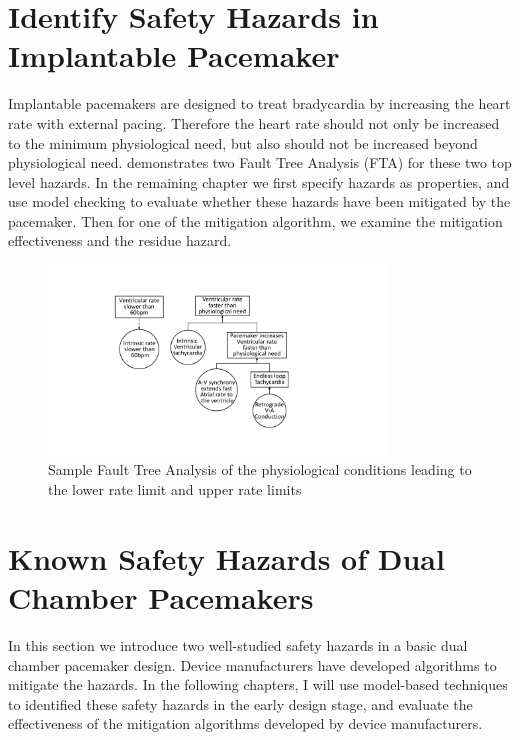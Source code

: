 \section{Identify Safety Hazards in Implantable Pacemaker}
Implantable pacemakers are designed to treat bradycardia by increasing the heart rate with external pacing. Therefore the heart rate should not only be increased to the minimum physiological need, but also should not be increased beyond physiological need.  demonstrates two Fault Tree Analysis (FTA) for these two top level hazards. In the remaining chapter we first specify hazards as properties, and use model checking to evaluate whether these hazards have been mitigated by the pacemaker. Then for one of the mitigation algorithm, we examine the mitigation effectiveness and the residue hazard.
\begin{figure}[!t]
		\centering
		\includegraphics[width=0.8\textwidth]{figs/risk_requirements.pdf}
		\caption{\small Sample Fault Tree Analysis of the physiological conditions leading to the lower rate limit and upper rate limits}
		\label{fig:risk_req}
\end{figure}

\section{Known Safety Hazards of Dual Chamber Pacemakers}
In this section we introduce two well-studied safety hazards in a basic dual chamber pacemaker design.
Device manufacturers have developed algorithms to mitigate the hazards.
In the following chapters, I will use model-based techniques to identified these safety hazards in the early design stage, and evaluate the effectiveness of the mitigation algorithms developed by device manufacturers.

